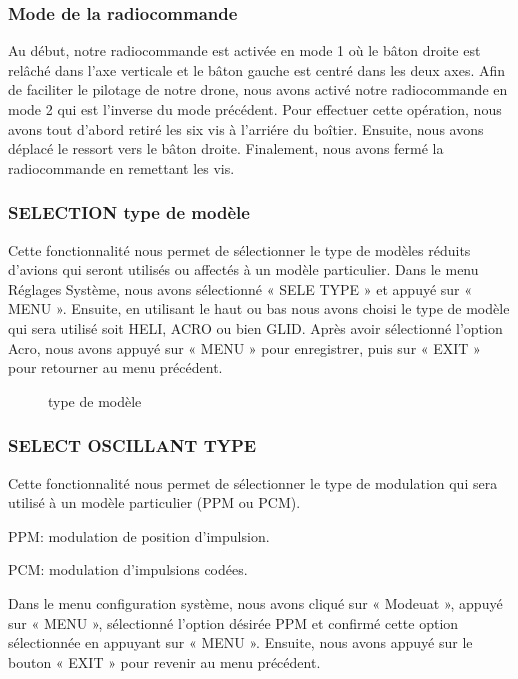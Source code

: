 	\subsubsection{Mode de la radiocommande}
	Au début, notre radiocommande est activée en mode 1 où le bâton droite est relâché dans l'axe verticale et le bâton gauche est centré dans les deux axes. Afin de faciliter le pilotage de notre drone, nous avons activé notre radiocommande en mode 2  qui est l'inverse du mode précédent. Pour effectuer cette opération, nous avons tout d'abord retiré les six vis à l'arriére du boîtier. Ensuite, nous avons déplacé le ressort vers le bâton droite.  Finalement, nous avons fermé la radiocommande en remettant les vis.
	
	
	\subsubsection{SELECTION type de modèle}
	Cette fonctionnalité nous permet de sélectionner le type de modèles réduits d'avions qui seront utilisés ou affectés à un modèle particulier.
	Dans le menu Réglages Système, nous avons sélectionné « SELE TYPE » et appuyé sur « MENU ». Ensuite, en utilisant le haut ou bas nous avons choisi le type de modèle qui sera utilisé soit HELI, ACRO ou bien GLID. Après avoir sélectionné l'option Acro, nous avons appuyé sur « MENU  » pour enregistrer, puis sur « EXIT » pour retourner au menu précédent.
	
	\begin{figure}[H]
		\begin{center}
			\centering
		\end{center}
		\caption{type de modèle}
	\end{figure}
\subsubsection{ SELECT OSCILLANT TYPE}
Cette fonctionnalité nous permet de sélectionner le type de modulation qui sera utilisé à un modèle particulier (PPM ou PCM).


PPM: modulation de position d'impulsion. 

PCM: modulation d'impulsions codées.


Dans le menu configuration système, nous avons cliqué sur « Modeuat », appuyé sur « MENU », sélectionné l'option désirée PPM et confirmé cette option sélectionnée en appuyant sur « MENU ». Ensuite, nous avons appuyé sur le bouton « EXIT » pour revenir au menu précédent.

